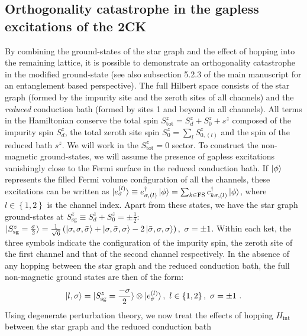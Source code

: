 \documentclass[12pt]{iopart}
\begin{document}
\subsection{Orthogonality catastrophe in the gapless excitations of the 2CK}
By combining the ground-states of the star graph and the effect of hopping into the remaining lattice, it is possible to demonstrate an orthogonality catastrophe~\cite{anderson1967infrared,varma2002singular} in the modified ground-state (see also subsection 5.2.3 of the main manuscript for an entanglement based perspective). The full Hilbert space consists of the star graph (formed by the impurity site and the zeroth sites of all channels) and the {\it reduced} conduction bath (formed by sites 1 and beyond in all channels). All terms in the Hamiltonian conserve the total spin \(S_\text{tot}^z = S_d^z + S_0^z + s^z\) composed of the impurity spin \(S_d^z\), the total zeroth site spin \(S_0^z = \sum_l S_{0,(l)}^z\) and the spin of the reduced bath \(s^z\). We will work in the \(S_\text{tot}^z = 0\) sector. To construct the non-magnetic ground-states, we will assume the presence of gapless excitations vanishingly close to the Fermi surface in the reduced conduction bath. If \(\ket{\phi}\) represents the filled Fermi volume configuration of all the channels, these excitations can be written as \(\ket{e_\sigma^{(l)}} \equiv e^\dagger_{\sigma,(l)} \ket{\phi} = \sum_{k \in \text{FS}}c^\dagger_{k\sigma,(l)} \ket{\phi}\), where \(l \in \left\{1,2\right\} \) is the channel index. Apart from these states, we have the star graph ground-states at \(S_\text{sg}^z \equiv S_d^z + S_0^z = \pm \frac{1}{2}\): \(\ket{S_\text{sg}^z = \frac{\sigma}{2}} = \frac{1}{\sqrt 6}\left( \ket{\sigma,\sigma,\bar\sigma} + \ket{\sigma,\bar\sigma,\sigma} -2\ket{\bar\sigma,\sigma,\sigma} \right),~ \sigma=\pm 1 \). Within each ket, the three symbols indicate the configuration of the impurity spin, the zeroth site of the first channel and that of the second channel respectively. In the absence of any hopping between the star graph and the reduced conduction bath, the full non-magnetic ground states are then of the form:
\begin{equation}\begin{aligned}
	\ket{l,\sigma} = \ket{S^z_\text{sg}=\frac{-\sigma}{2}}\otimes\ket{e_{\sigma}^{(l)}},~l\in\left\{ 1,2 \right\},~\sigma=\pm 1~.
\end{aligned}\end{equation}
Using degenerate perturbation theory, we now treat the effects of hopping \(H_\text{int}\) between the star graph and the reduced conduction bath
\end{document}
